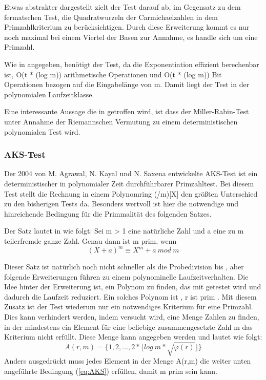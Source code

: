  		Etwas abstrakter dargestellt zielt der Test darauf ab, im Gegensatz zu dem fermatschen Test, die Quadratwurzeln der Carmichaelzahlen in dem Primzahlkriterium zu berücksichtigen. Durch diese Erweiterung kommt es nur noch maximal bei einem Viertel der Basen zur Annahme, es handle sich um eine Primzahl.
 		
 		Wie in \cite{Algebraische:und:zahlentheoretische:Grundlagen:fuer:die:Informatik} angegeben, benötigt der Test, da die Exponentiation effizient berechenbar ist, O(t * (log m)) arithmetische Operationen und O(t * (log m)) Bit Operationen bezogen auf die Eingabelänge von m. Damit liegt der Test in der polynomialen Laufzeitklasse.
 		
 		Eine interessante Aussage die in \cite{Algorithmische:Zahlentheorie} getroffen wird, ist dass der Miller-Rabin-Test unter Annahme der Riemannschen Vermutung zu einem deterministischen polynomialen Test wird.
 		

		\subsubsection{AKS-Test}
		Der 2004 von M. Agrawal, N. Kayal und N. Saxena entwickelte AKS-Test \cite{Primes:is:in:P} ist ein deterministischer in polynomialer Zeit durchführbarer Primzahltest. Bei diesem Test stellt die Rechnung in einem Polynomring (/m)[X] den größten Unterschied zu den bisherigen Tests da. Besonders wertvoll ist hier die notwendige und hinreichende Bedingung für die Primmalität des folgenden Satzes. 
		
		Der Satz lautet in \cite{Algorithmische:Zahlentheorie} wie folgt:
		Sei m > 1 eine natürliche Zahl und a eine zu m teilerfremde ganze
		Zahl. Genau dann ist m prim, wenn
		\begin{displaymath} 
			(X + a)^m \equiv X^m + a~mod~m
		\end{displaymath}
		
		Dieser Satz ist natürlich noch nicht schneller als die Probedivision bis , aber folgende Erweiterungen führen zu einem polynominelle Laufzeitverhalten. Die Idee hinter der Erweiterung ist, ein Polynom zu finden, das mit getestet wird und dadurch die Laufzeit reduziert. Ein solches Polynom ist , r ist prim . Mit diesem Zusatz ist der Test wiederum nur ein notwendiges Kriterium für eine Primzahl. Dies kann verhindert werden, indem versucht wird, eine Menge Zahlen zu finden, in der mindestens ein Element für eine beliebige zusammengesetzte Zahl m das Kriterium nicht erfüllt. Diese Menge kann angegeben werden und lautet wie folgt:
		\begin{displaymath}
			A(r,m) = \{1, 2, . . . , 2 * \lfloor log~m *\sqrt{\varphi(r)} \rfloor\}
		\end{displaymath}
		Anders ausgedrückt muss jedes Element in der Menge A(r,m) die weiter unten angeführte Bedingung (\ref{eq:AKS}) erfüllen, damit m prim sein kann.
		
